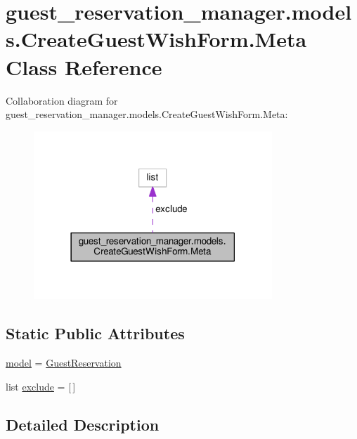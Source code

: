 \hypertarget{classguest__reservation__manager_1_1models_1_1CreateGuestWishForm_1_1Meta}{\section{guest\-\_\-reservation\-\_\-manager.\-models.\-Create\-Guest\-Wish\-Form.\-Meta Class Reference}
\label{classguest__reservation__manager_1_1models_1_1CreateGuestWishForm_1_1Meta}
}


Collaboration diagram for guest\-\_\-reservation\-\_\-manager.\-models.\-Create\-Guest\-Wish\-Form.\-Meta\-:
\nopagebreak
\begin{figure}[H]
\begin{center}
\leavevmode
\includegraphics[width=254pt]{classguest__reservation__manager_1_1models_1_1CreateGuestWishForm_1_1Meta__coll__graph}
\end{center}
\end{figure}
\subsection*{Static Public Attributes}
\begin{DoxyCompactItemize}
\item 
\hyperlink{classguest__reservation__manager_1_1models_1_1CreateGuestWishForm_1_1Meta_acf928f83413ee48d0995bab8bf120818}{model} = \hyperlink{classguest__reservation__manager_1_1models_1_1GuestReservation}{Guest\-Reservation}
\item 
list \hyperlink{classguest__reservation__manager_1_1models_1_1CreateGuestWishForm_1_1Meta_a4a8d3d18aa8f12178a23eb0be82cfad8}{exclude} = \mbox{[}$\,$\mbox{]}
\end{DoxyCompactItemize}


\subsection{Detailed Description}


